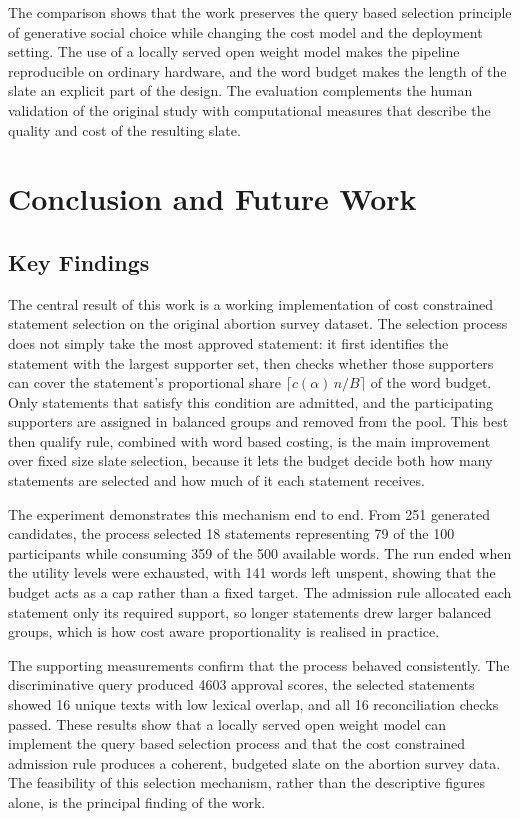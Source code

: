 \documentclass[letterpaper,11pt]{article}
\theoremstyle{plain}
\theoremstyle{definition}
\begin{document}
The comparison shows that the work preserves the query based selection principle of generative social choice while changing the cost model and the deployment setting. The use of a locally served open weight model makes the pipeline reproducible on ordinary hardware, and the word budget makes the length of the slate an explicit part of the design. The evaluation complements the human validation of the original study with computational measures that describe the quality and cost of the resulting slate.

\section{Conclusion and Future Work}

\subsection{Key Findings}

The central result of this work is a working implementation of cost constrained statement selection on the original abortion survey dataset. The selection process does not simply take the most approved statement: it first identifies the statement with the largest supporter set, then checks whether those supporters can cover the statement's proportional share $\lceil c(\alpha)\,n/B\rceil$ of the word budget. Only statements that satisfy this condition are admitted, and the participating supporters are assigned in balanced groups and removed from the pool. This best then qualify rule, combined with word based costing, is the main improvement over fixed size slate selection, because it lets the budget decide both how many statements are selected and how much of it each statement receives.

The experiment demonstrates this mechanism end to end. From 251 generated candidates, the process selected 18 statements representing 79 of the 100 participants while consuming 359 of the 500 available words. The run ended when the utility levels were exhausted, with 141 words left unspent, showing that the budget acts as a cap rather than a fixed target. The admission rule allocated each statement only its required support, so longer statements drew larger balanced groups, which is how cost aware proportionality is realised in practice.

The supporting measurements confirm that the process behaved consistently. The discriminative query produced 4603 approval scores, the selected statements showed 16 unique texts with low lexical overlap, and all 16 reconciliation checks passed. These results show that a locally served open weight model can implement the query based selection process and that the cost constrained admission rule produces a coherent, budgeted slate on the abortion survey data. The feasibility of this selection mechanism, rather than the descriptive figures alone, is the principal finding of the work.
\end{document}
